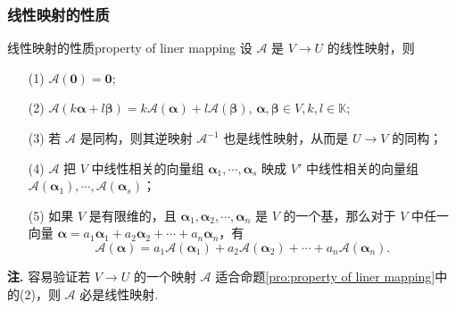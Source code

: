 \documentclass[12pt, a4paper,newtx]{ctexart}
\newenvironment{remark}{\dbend\textbf{注. }}{}{}
\begin{document}
\subsubsection{线性映射的性质}
\begin{proposition}{线性映射的性质}{property of liner mapping}
	设 $\mathcal A$ 是 $V \rightarrow U$ 的线性映射，则
	\begin{enumerate}
		\item[(1)] $\mathcal A(\bm 0) = \bm 0$;
		\item[(2)] $\mathcal A(k\bm\alpha + l\bm\beta) = k\mathcal A(\bm\alpha) + l\mathcal A(\bm\beta)$, $\bm\alpha, \bm\beta \in V, k, l \in \mathbb{K}$;
		\item[(3)] 若 $\mathcal A$ 是同构，则其逆映射 $\mathcal A^{-1}$ 也是线性映射，从而是 $U \rightarrow V$ 的同构；
		\item[(4)] $\mathcal{A}$ 把 $V$ 中线性相关的向量组 $\bm\alpha_1, \cdots, \bm\alpha_s$ 映成 $V'$ 中线性相关的向量组 $\mathcal{A}(\bm\alpha_1), \cdots, \mathcal{A}(\bm\alpha_s)$；
		\item[(5)] 如果 $V$ 是有限维的，且 $\bm\alpha_1, \bm\alpha_2, \cdots, \bm\alpha_n$ 是 $V$ 的一个基，那么对于 $V$ 中任一向量 $\bm\alpha = a_1\bm\alpha_1 + a_2\bm\alpha_2 + \cdots + a_n\bm\alpha_n$，有
		\[
		\mathcal{A}(\bm\alpha) = a_1\mathcal{A}(\bm\alpha_1) + a_2\mathcal{A}(\bm\alpha_2) + \cdots + a_n\mathcal{A}(\bm\alpha_n). 
		\]
	\end{enumerate}
\end{proposition}
\begin{remark}
	容易验证若 $V \rightarrow U$ 的一个映射 $\mathcal A$ 适合命题\ref{pro:property of liner mapping}中的(2)，则 $\mathcal A$ 必是线性映射. 
\end{remark}
\end{document}
